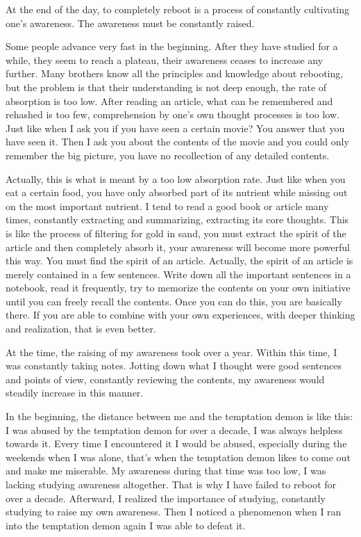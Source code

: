 \documentclass[
]{book}
\begin{document}
At the end of the day, to completely reboot is a process of constantly cultivating one's awareness. The awareness must be constantly raised.

Some people advance very fast in the beginning. After they have studied for a while, they seem to reach a plateau, their awareness ceases to increase any further. Many brothers know all the principles and knowledge about rebooting, but the problem is that their understanding is not deep enough, the rate of absorption is too low. After reading an article, what can be remembered and rehashed is too few, comprehension by one's own thought processes is too low. Just like when I ask you if you have seen a certain movie? You answer that you have seen it. Then I ask you about the contents of the movie and you could only remember the big picture, you have no recollection of any detailed contents.

Actually, this is what is meant by a too low absorption rate. Just like when you eat a certain food, you have only absorbed part of its nutrient while missing out on the most important nutrient. I tend to read a good book or article many times, constantly extracting and summarizing, extracting its core thoughts. This is like the process of filtering for gold in sand, you must extract the spirit of the article and then completely absorb it, your awareness will become more powerful this way. You must find the spirit of an article. Actually, the spirit of an article is merely contained in a few sentences. Write down all the important sentences in a notebook, read it frequently, try to memorize the contents on your own initiative until you can freely recall the contents. Once you can do this, you are basically there. If you are able to combine with your own experiences, with deeper thinking and realization, that is even better.

At the time, the raising of my awareness took over a year. Within this time, I was constantly taking notes. Jotting down what I thought were good sentences and points of view, constantly reviewing the contents, my awareness would steadily increase in this manner.

In the beginning, the distance between me and the temptation demon is like this: I was abused by the temptation demon for over a decade, I was always helpless towards it. Every time I encountered it I would be abused, especially during the weekends when I was alone, that's when the temptation demon likes to come out and make me miserable. My awareness during that time was too low, I was lacking studying awareness altogether. That is why I have failed to reboot for over a decade. Afterward, I realized the importance of studying, constantly studying to raise my own awareness. Then I noticed a phenomenon when I ran into the temptation demon again I was able to defeat it.
\end{document}
